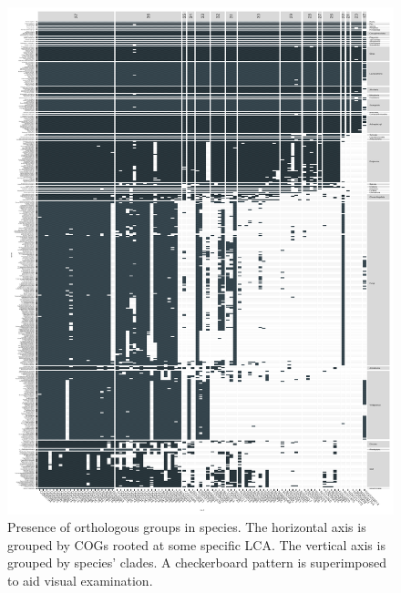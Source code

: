 \begin{figure}

{\centering \includegraphics{figs/analysis.geneplast.unnamed-chunk-7-1} 

}

\caption{Presence of orthologous groups in species. The horizontal axis is grouped by COGs rooted at some specific LCA. The vertical axis is grouped by species' clades. A checkerboard pattern is superimposed to aid visual examination.}\label{fig:unnamed-chunk-7}
\end{figure}
